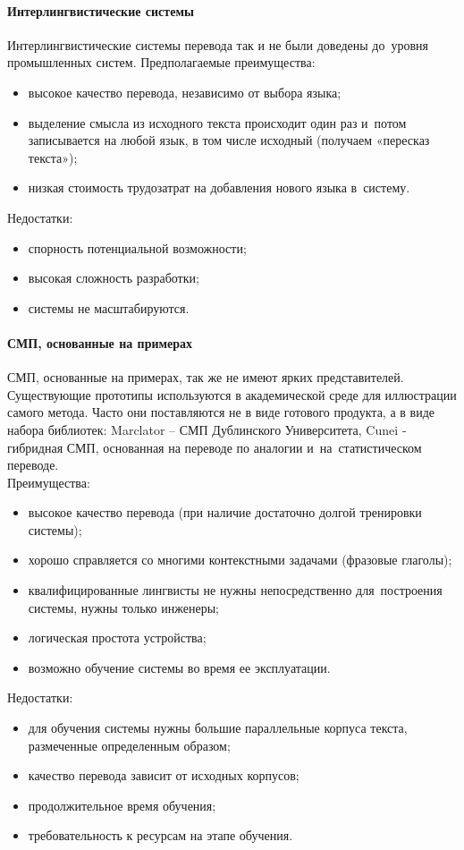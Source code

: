 \paragraph{Интерлингвистические системы}

Интерлингвистические системы перевода так и 
не были доведены до~уровня промышленных систем.
Предполагаемые преимущества:
\begin{itemize}
	\item  высокое качество перевода, независимо от выбора языка;
	\item  выделение смысла из исходного текста происходит один раз и~потом записывается на любой язык, в том числе исходный 
	(получаем «пересказ текста»);
	\item  низкая стоимость трудозатрат на добавления нового языка в~систему.
\end{itemize}
Недостатки: 
\begin{itemize}
	\item  спорность потенциальной возможности;
	\item  высокая сложность разработки;
	\item  системы не масштабируются.
\end{itemize}

\paragraph{СМП, основанные на примерах}

СМП, основанные на примерах, так же не имеют ярких представителей. Существующие прототипы используются в академической среде для иллюстрации самого метода. Часто они поставляются не в виде готового продукта, а в виде набора библиотек:
Marclator – СМП Дублинского Университета, Cunei ‑ гибридная СМП, основанная на переводе по аналогии и~на~статистическом переводе. \\
Преимущества:
\begin{itemize}
	\item  высокое качество перевода  (при наличие достаточно долгой тренировки системы);
	\item  хорошо справляется со многими контекстными задачами  (фразовые глаголы);
	\item  квалифицированные лингвисты не нужны непосредственно для~построения системы, нужны только инженеры;
	\item  логическая простота устройства;
	\item  возможно обучение системы во время ее эксплуатации.
\end{itemize}
Недостатки: 
\begin{itemize}
	\item  для обучения системы нужны большие параллельные корпуса текста, размеченные определенным образом;
	\item  качество перевода зависит от исходных корпусов;
	\item  продолжительное время обучения;
	\item  требовательность к ресурсам на этапе обучения.
\end{itemize}

